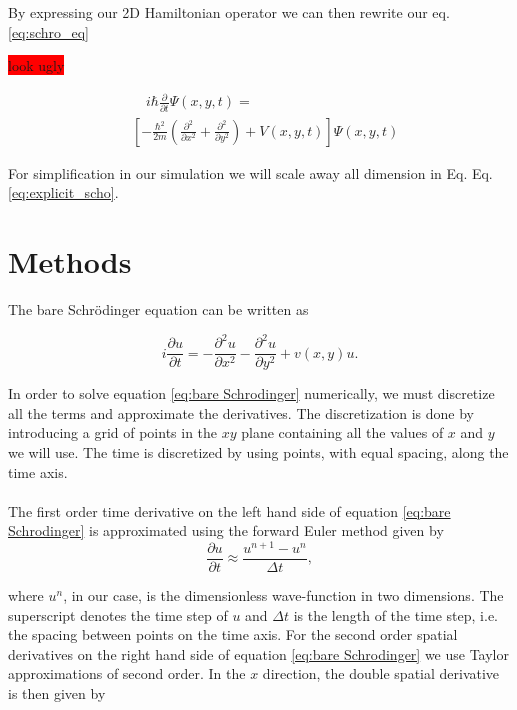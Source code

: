 \documentclass[english,notitlepage,reprint,nofootinbib]{revtex4-2}  %
\begin{document}
	By expressing our 2D Hamiltonian operator we can then rewrite our eq. \ref{eq:schro_eq} 
	
	
	\colorbox{red}{look ugly}
	
	\begin{align*}
		& \quad i \hbar \frac{\partial}{\partial t} \Psi(x, y, t)= \\
		& \left[-\frac{\hbar^{2}}{2 m}\left(\frac{\partial^{2}}{\partial x^{2}}+\frac{\partial^{2}}{\partial y^{2}}\right)+V(x, y, t)\right] \Psi(x, y, t) \tag{2} \label{eq:explicit_scho}
	\end{align*}
	
	
	For simplification in our simulation we will scale away all dimension in Eq.
	Eq. \ref{eq:explicit_scho}. 
	
	
	\section{Methods}\label{sec:methods}
	The bare Schrödinger equation can be written as 

	\begin{equation}\label{eq:bare Schrodinger}
		i \frac{\partial u}{\partial t} = -\frac{\partial^2 u}{\partial x^2} - \frac{\partial^2 u}{\partial y^2} + v(x,y) u.
	\end{equation} 
	
	In order to solve equation \ref{eq:bare Schrodinger} numerically, we must discretize all the terms and approximate
	the derivatives. The discretization is done by introducing a grid of points in the
	$xy$ plane containing all the values of $x$ and $y$ we will use. The time is discretized by using points, with equal spacing, along the time axis.\\ \\
	The first order time derivative on the left hand side of equation \ref{eq:bare Schrodinger} is approximated using the forward Euler method given by
	\begin{equation}
		\frac{\partial u}{\partial t} \approx \frac{u^{n+1}-u^n}{\Delta t},
	\end{equation}

	where $u^n$, in our case, is the dimensionless wave-function in two dimensions.
	The superscript denotes the time step of $u$ and $\Delta t$ is the length of the time
	step, i.e. the spacing between points on the time axis.	For the second order spatial derivatives
	on the right hand side of equation \ref{eq:bare Schrodinger}
	we use Taylor approximations of second order. In the $x$ direction,
	the double spatial derivative is then given by
	
\end{document}
